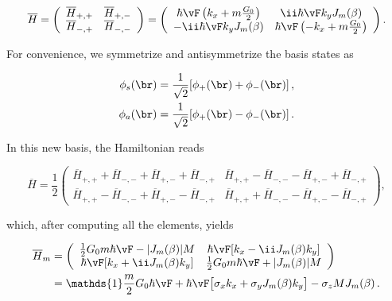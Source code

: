 \begin{equation}
    \overline{H} = \left(\begin{array}{cc}
                         \overline{H}_{+,+} & \overline{H}_{+,-}\\
                         \overline{H}_{-,+} & \overline{H}_{-,-}
                         \end{array}\right)=\left(
                         \begin{array}{cc}
                         \hbar \vF \left(k_{x}+m\frac{G_{0}}{2}\right) & \ii \hbar \vF k_{y}J_{m}(\beta)\\
                         -\ii \hbar \vF k_{y}J_{m}(\beta) & \hbar \vF \left(-k_{x}+m\frac{G_{0}}{2}\right)
                         \end{array}\right).
\end{equation}

\noindent For convenience, we symmetrize and antisymmetrize the basis states as

\begin{equation}
\begin{aligned}
    \phi_{s}(\br) & =\frac{1}{\sqrt{2}}[\phi_{+}(\br)+\phi_{-}(\br)]\,,\\
    \phi_{a}(\br) & =\frac{1}{\sqrt{2}}[\phi_{+}(\br)-\phi_{-}(\br)]\,.
\end{aligned}
\end{equation}

\noindent In this new basis, the Hamiltonian reads

\begin{equation}
    \overline{H}=\frac{1}{2}
    \left(\begin{array}{cc}
          \overline{H}_{+,+}+\overline{H}_{-,-}+\overline{H}_{+,-}+\overline{H}_{-,+} & \overline{H}_{+,+}-\overline{H}_{-,-}-\overline{H}_{+,-}+\overline{H}_{-,+}\\
          \overline{H}_{+,+}-\overline{H}_{-,-}+\overline{H}_{+,-}-\overline{H}_{-,+} & \overline{H}_{+,+}+\overline{H}_{-,-}-\overline{H}_{+,-}-\overline{H}_{-,+}
          \end{array}\right),
\end{equation}

\noindent which, after computing all the elements, yields

\begin{equation}
    \label{eq:new_Dirac_Hamiltonian}
    \begin{aligned}
        \overline{H}_m & =
        \left(\begin{array}{cc}
               \frac{1}{2}G_{0}m\hbar \vF -|J_{m}(\beta)|M & \hbar \vF [k_{x}- \ii J_{m}(\beta)k_{y}] \\
               \hbar \vF [k_{x}+ \ii J_{m}(\beta)k_{y}] & \frac{1}{2}G_{0}m\hbar \vF +|J_{m}(\beta)|M
              \end{array}\right) \\
        & = \mathds{1}\frac{m}{2}G_{0} \hbar \vF + \hbar \vF \big[\sigma_{x} k_{x} + \sigma_{y} J_{m}(\beta) k_{y}\big] - \sigma_{z} M J_{m}(\beta)\,.
    \end{aligned}
\end{equation}

